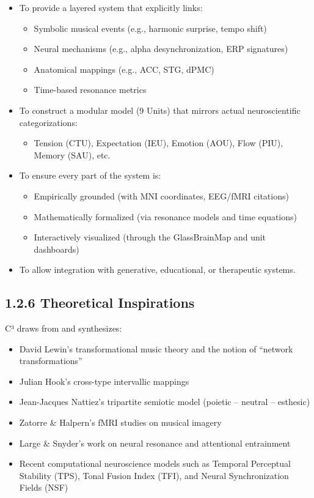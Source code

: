 \documentclass[10pt]{article}
\begin{document}
\begin{itemize}
    \item To provide a layered system that explicitly links:
    \begin{itemize}
        \item Symbolic musical events (e.g., harmonic surprise, tempo shift)
        \item Neural mechanisms (e.g., alpha desynchronization, ERP signatures)
        \item Anatomical mappings (e.g., ACC, STG, dPMC)
        \item Time-based resonance metrics
    \end{itemize}
    
    \item To construct a modular model (9 Units) that mirrors actual neuroscientific categorizations:
    
    \begin{itemize}
        \item Tension (CTU), Expectation (IEU), Emotion (AOU), Flow (PIU), Memory (SAU), etc.
    \end{itemize}
    
    \item To ensure every part of the system is:
    \begin{itemize}
        \item Empirically grounded (with MNI coordinates, EEG/fMRI citations)
        \item Mathematically formalized (via resonance models and time equations)
        \item Interactively visualized (through the GlassBrainMap and unit dashboards)
    \end{itemize}
    
    \item To allow integration with generative, educational, or therapeutic systems.
\end{itemize}

\subsection*{1.2.6 Theoretical Inspirations}

C³ draws from and synthesizes:

\begin{itemize}
    \item David Lewin’s transformational music theory and the notion of “network transformations”
    \item Julian Hook’s cross-type intervallic mappings
    \item Jean-Jacques Nattiez’s tripartite semiotic model (poietic – neutral – esthesic)
    \item Zatorre \& Halpern’s fMRI studies on musical imagery
    \item Large \& Snyder’s work on neural resonance and attentional entrainment
    \item Recent computational neuroscience models such as Temporal Perceptual Stability (TPS), Tonal Fusion Index (TFI), and Neural Synchronization Fields (NSF)
\end{itemize}
\end{document}
